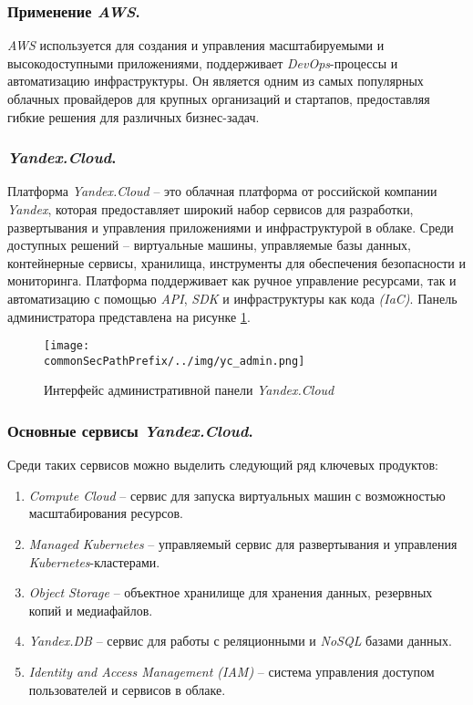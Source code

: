 \subsubsection{Применение \textit{AWS}.}
\textit{AWS} используется для создания и управления масштабируемыми и высокодоступными приложениями, поддерживает \textit{DevOps}-процессы и автоматизацию инфраструктуры. Он является одним из самых популярных облачных провайдеров для крупных организаций и стартапов, предоставляя гибкие решения для различных бизнес-задач.

\subsubsection{\textit{Yandex.Cloud}.}
\label{sec:yandex_cloud}
Платформа \textit{Yandex.Cloud} -- это облачная платформа от российской компании \textit{Yandex}, которая предоставляет широкий набор сервисов для разработки, развертывания и управления приложениями и инфраструктурой в облаке.
Среди доступных решений -- виртуальные машины, управляемые базы данных, контейнерные сервисы, хранилища, инструменты для обеспечения безопасности и мониторинга.
Платформа поддерживает как ручное управление ресурсами, так и автоматизацию с помощью \textit{API}, \textit{SDK} и инфраструктуры как кода \textit{(IaC)}. Панель администратора представлена на рисунке \ref{fig:user_guide:yc_admin}.

\begin{figure}[ht]
    \centering
    \texttt{[image: \\commonSecPathPrefix/../img/yc\_admin.png]}
    \caption{Интерфейс административной панели \textit{Yandex.Cloud}}
    \label{fig:user_guide:yc_admin}
\end{figure}

\subsubsection{Основные сервисы \textit{Yandex.Cloud}.} Среди таких сервисов можно выделить следующий ряд ключевых продуктов:
\begin{enumerate}
    \item \textit{Compute Cloud} -- сервис для запуска виртуальных машин с возможностью масштабирования ресурсов.
    \item \textit{Managed Kubernetes} -- управляемый сервис для развертывания и управления \textit{Kubernetes}-кластерами.
    \item \textit{Object Storage} -- объектное хранилище для хранения данных, резервных копий и медиафайлов.
    \item \textit{Yandex.DB} -- сервис для работы с реляционными и \textit{NoSQL} базами данных.
    \item \textit{Identity and Access Management (IAM)} -- система управления доступом пользователей и сервисов в облаке.
\end{enumerate}

